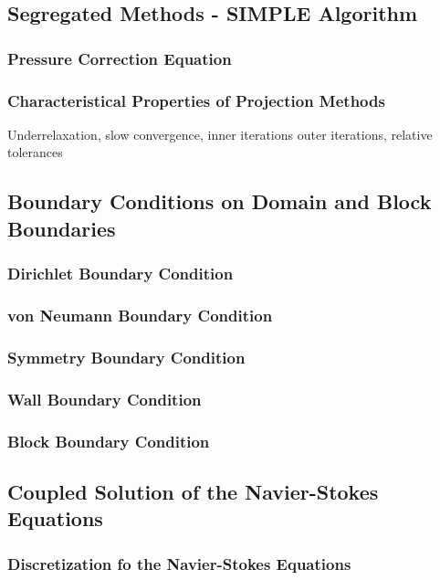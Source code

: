 \documentclass[article,type=msc,colorback,accentcolor=tud2a]{tudthesis}
\begin{document}
    \subsection{Segregated Methods - SIMPLE Algorithm}
      
      \subsubsection{Pressure Correction Equation}
      \subsubsection{Characteristical Properties of Projection Methods}

        Underrelaxation, slow convergence, inner iterations outer iterations, relative tolerances

    \subsection{Boundary Conditions on Domain and Block Boundaries}
      
      \subsubsection{Dirichlet Boundary Condition}
      \subsubsection{von Neumann Boundary Condition}
      \subsubsection{Symmetry Boundary Condition}
      \subsubsection{Wall Boundary Condition}
      \subsubsection{Block Boundary Condition}
      
    \subsection{Coupled Solution of the Navier-Stokes Equations}

      \subsubsection{Discretization fo the Navier-Stokes Equations}
\end{document}
